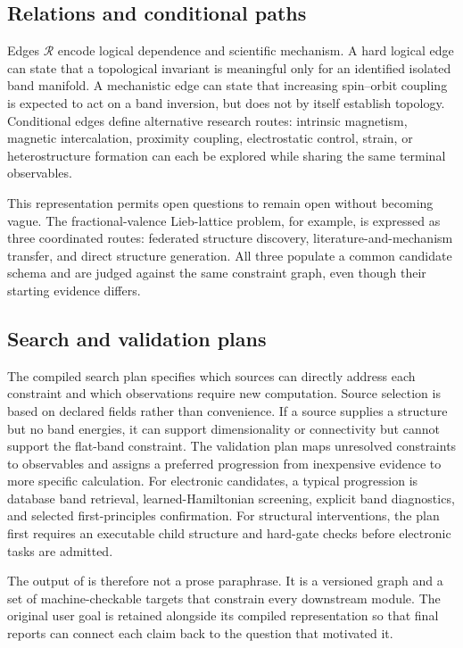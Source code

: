 \subsection{Relations and conditional paths}

Edges $\mathcal{R}$ encode logical dependence and scientific mechanism.  A hard logical edge can state that a topological invariant is meaningful only for an identified isolated band manifold.  A mechanistic edge can state that increasing spin--orbit coupling is expected to act on a band inversion, but does not by itself establish topology.  Conditional edges define alternative research routes: intrinsic magnetism, magnetic intercalation, proximity coupling, electrostatic control, strain, or heterostructure formation can each be explored while sharing the same terminal observables.

This representation permits open questions to remain open without becoming vague.  The fractional-valence Lieb-lattice problem, for example, is expressed as three coordinated routes: federated structure discovery, literature-and-mechanism transfer, and direct structure generation.  All three populate a common candidate schema and are judged against the same constraint graph, even though their starting evidence differs.

\subsection{Search and validation plans}

The compiled search plan specifies which sources can directly address each constraint and which observations require new computation.  Source selection is based on declared fields rather than convenience.  If a source supplies a structure but no band energies, it can support dimensionality or connectivity but cannot support the flat-band constraint.  The validation plan maps unresolved constraints to observables and assigns a preferred progression from inexpensive evidence to more specific calculation.  For electronic candidates, a typical progression is database band retrieval, learned-Hamiltonian screening, explicit band diagnostics, and selected first-principles confirmation.  For structural interventions, the plan first requires an executable child structure and hard-gate checks before electronic tasks are admitted.

The output of \matspec is therefore not a prose paraphrase.  It is a versioned graph and a set of machine-checkable targets that constrain every downstream module.  The original user goal is retained alongside its compiled representation so that final reports can connect each claim back to the question that motivated it.
